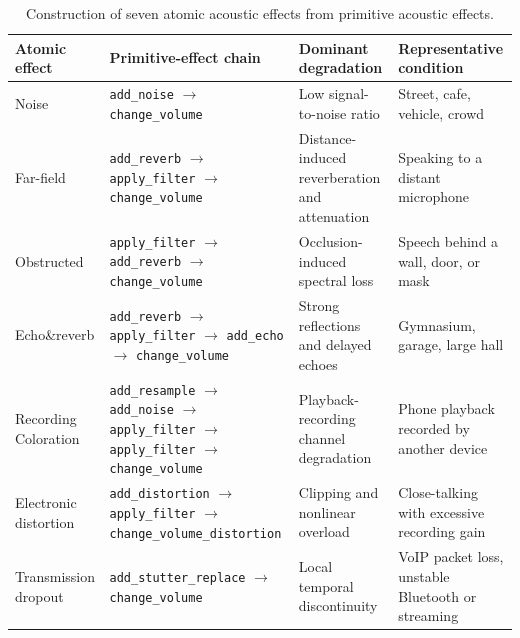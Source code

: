 \documentclass{article}
\begin{document}
\begin{table}[t]
\centering
\small
\setlength{\tabcolsep}{4pt}
\renewcommand{\arraystretch}{1.15}
\caption{Construction of seven atomic acoustic effects from primitive acoustic effects.}
\label{tab:atomic_effect_chains}
\begin{tabular}{p{} p{} p{} p{}}
\toprule
\textbf{Atomic effect} & \textbf{Primitive-effect chain} & \textbf{Dominant degradation} & \textbf{Representative condition} \\
\midrule
Noise
& \texttt{add\_noise} $\rightarrow$ \texttt{change\_volume}
& Low signal-to-noise ratio
& Street, cafe, vehicle, crowd \\

Far-field
& \texttt{add\_reverb} $\rightarrow$ \texttt{apply\_filter} $\rightarrow$ \texttt{change\_volume}
& Distance-induced reverberation and attenuation
& Speaking to a distant microphone \\

Obstructed
& \texttt{apply\_filter} $\rightarrow$ \texttt{add\_reverb} $\rightarrow$ \texttt{change\_volume}
& Occlusion-induced spectral loss
& Speech behind a wall, door, or mask \\

Echo\&reverb
& \texttt{add\_reverb} $\rightarrow$ \texttt{apply\_filter} $\rightarrow$ \texttt{add\_echo} $\rightarrow$ \texttt{change\_volume}
& Strong reflections and delayed echoes
& Gymnasium, garage, large hall \\

Recording Coloration
& \texttt{add\_resample} $\rightarrow$ \texttt{add\_noise} $\rightarrow$ \texttt{apply\_filter} $\rightarrow$ \texttt{apply\_filter} $\rightarrow$ \texttt{change\_volume}
& Playback-recording channel degradation
& Phone playback recorded by another device \\

Electronic distortion
& \texttt{add\_distortion} $\rightarrow$ \texttt{apply\_filter} $\rightarrow$ \texttt{change\_volume\_distortion}
& Clipping and nonlinear overload
& Close-talking with excessive recording gain \\

Transmission dropout
& \texttt{add\_stutter\_replace} $\rightarrow$ \texttt{change\_volume}
& Local temporal discontinuity
& VoIP packet loss, unstable Bluetooth or streaming \\
\bottomrule
\end{tabular}
\end{table}
\end{document}
